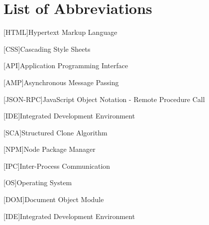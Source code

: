 \section{List of Abbreviations}
\label{sec:list-of-abbreviations}
\hfill
\begin{acronym}
    [HTML]{Hypertext Markup Language}
\end{acronym}

\begin{acronym}
    [CSS]{Cascading Style Sheets}
\end{acronym}

\begin{acronym}
    [API]{Application Programming Interface}
\end{acronym}

\begin{acronym}
    [AMP]{Asynchronous Message Passing}
\end{acronym}

\begin{acronym}
    [JSON-RPC]{JavaScript Object Notation - Remote Procedure Call}
\end{acronym}

\begin{acronym}
    [IDE]{Integrated Development Environment}
\end{acronym}

\begin{acronym}
    [SCA]{Structured Clone Algorithm}
\end{acronym}

\begin{acronym}
    [NPM]{Node Package Manager}
\end{acronym}

\begin{acronym}
    [IPC]{Inter-Process Communication}
\end{acronym}

\begin{acronym}
    [OS]{Operating System}
\end{acronym}


\begin{acronym}
    [DOM]{Document Object Module}
\end{acronym}

\begin{acronym}
    [IDE]{Integrated Development Environment}
\end{acronym}

